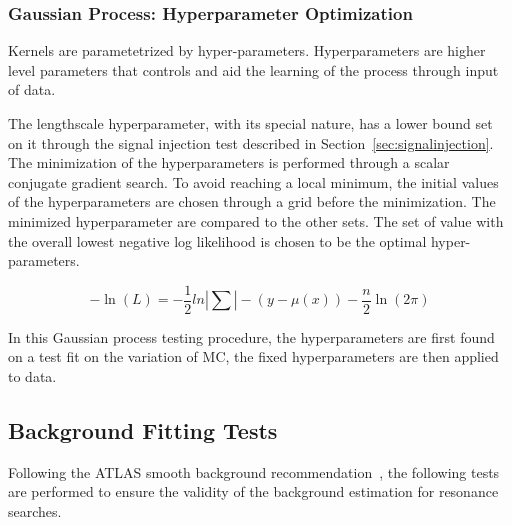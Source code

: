     \subsubsection{Gaussian Process: Hyperparameter Optimization}
    \label{sec:hyperparam}
    Kernels are parametetrized by hyper-parameters. Hyperparameters are higher level parameters that controls and aid the learning of the process through input of data. %


	The lengthscale hyperparameter, with its special nature, has a lower bound set on it through the signal injection test described in Section~\ref{sec:signalinjection}. The minimization of the hyperparameters is performed through a scalar conjugate gradient search. To avoid reaching a local minimum, the initial values of the hyperparameters are chosen through a grid before the minimization. The minimized hyperparameter are compared to the other sets. The set of value with the overall lowest negative log likelihood is chosen to be the optimal hyper-parameters.

    \begin{equation}
        -\ln(L) = -\frac{1}{2} ln |\sum| - (y-\mu(x) ) - \frac{n}{2}\ln(2\pi)
    \label{eq:loglikelihood}
    \end{equation}
    

    In this Gaussian process testing procedure, the hyperparameters are first found on a test fit on the variation of MC, the fixed hyperparameters are then applied to data.
%
\subsection{Background Fitting Tests}
Following the ATLAS smooth background recommendation~\cite{ATL-PHYS-PUB-2020-028}, the following tests are performed to ensure the validity of the background estimation for resonance searches.

